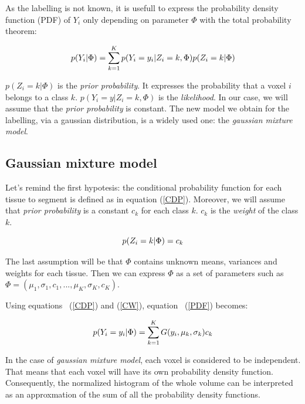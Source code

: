 \par
As the labelling is not known, it is usefull to express the probability density function (PDF) of $Y_i$ only depending on parameter $\Phi$ with the total probability theorem:

  \begin{equation}\label{PDF}
  p(Y_i|\Phi)=\sum_{k=1}^K p(Y_i=y_i|Z_i=k,\Phi)p(Z_i=k|\Phi)\\
  \end{equation}

\par
$p(Z_i=k|\Phi)$ is the \textit{prior probability}. It expresses the probability that a voxel $i$ belongs to a class $k$. $p(Y_i=y|Z_i=k,\Phi)$ is the \textit{likelihood}. In our case, we will assume that the \textit{prior probability} is constant. The new model we obtain for the labelling, via a gaussian distribution,  is a widely used one: the \textit{gaussian mixture model}.
%
\subsection{Gaussian mixture model}
Let's remind the first hypotesis: the conditional probability function for each tissue to segment is defined as in equation (\ref{CDP}). Moreover, we will assume that \textit{prior probability} is a constant $c_k$ for each class $k$. $c_k$ is the \textit{weight} of the class $k$.
  
  \begin{equation}\label{CW}
  p(Z_i=k|\Phi)=c_k\\
  \end{equation}

The last assumption will be that $\Phi$ contains unknown means, variances and weights for each tissue. Then we can express $\Phi$ as a set of parameters such as $\Phi=(\mu_1, \sigma_1, c_1, ..., \mu_K, \sigma_K, c_K)$. %
\par
Using equations ~(\ref{CDP}) and (\ref{CW}), equation ~(\ref{PDF}) becomes:
 
  \begin{equation}\label{GMM}
  p(Y_i=y_i|\Phi)=\sum_{k=1}^K G(y_i,\mu_k,\sigma_k)c_k\\
  \end{equation}

\par
In the case of \textit{gaussian mixture model}, each voxel is considered to be independent. That means that each voxel will have its own probability density function. Consequently, the normalized histogram of the whole volume can be interpreted as an approxmation of the sum of all the probability density functions. %
%
